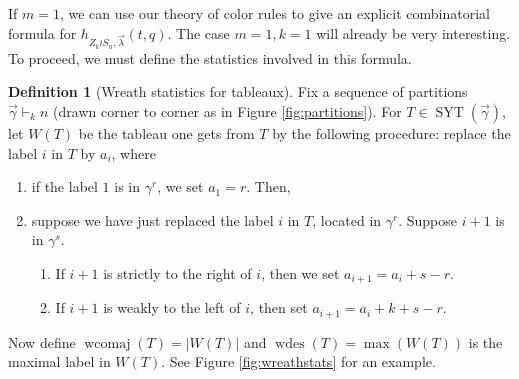 \documentclass[a4paper,12pt]{amsart}
\theoremstyle{plain}
\theoremstyle{definition}
\newtheorem{definition}[theorem]{Definition}
\theoremstyle{remark}
\DeclareMathOperator{\SYT}{SYT}
\DeclareMathOperator{\wcomaj}{wcomaj}
\DeclareMathOperator{\wdes}{wdes}
\begin{document}
If $m = 1$, we can use our theory of color rules to give an explicit combinatorial formula for $h_{Z_k \wr S_n, \vec{\lambda}}(t, q)$. The case $m = 1, k = 1$ will already be very interesting. To proceed, we must define the statistics involved in this formula.

\begin{definition}[Wreath statistics for tableaux]\label{definition:wreath_statistics_tableaux}
    Fix a sequence of partitions $\vec{\gamma} \vdash_k n$ (drawn corner to corner as in Figure \ref{fig:partitions}). For $T\in \SYT(\vec{\gamma})$, let $W(T)$ be the tableau one gets from $T$ by the following procedure: replace the label $i$ in $T$ by $a_i$, where
    \begin{enumerate}
        \item if the label $1$ is in $\gamma^{r}$, we set $a_1 = r$. Then,
        \item suppose we have just replaced the label $i$ in $T$, located in $\gamma^r$. Suppose $i+1$ is in $\gamma^s$. 
        \begin{enumerate}
        \item If $i+1$ is strictly to the right of $i$, then we set $a_{i+1} = a_i + s-r.$
        \item If $i+1$ is weakly to the left of $i$, then set $a_{i+1} = a_i + k + s-r.$
        \end{enumerate}
    \end{enumerate}
    Now define ${\wcomaj}(T) = |W(T)|$ and ${\wdes}(T) = \max(W(T))$ is the maximal label in $W(T)$. See Figure \ref{fig:wreathstats} for an example.
\end{definition}
\end{document}
